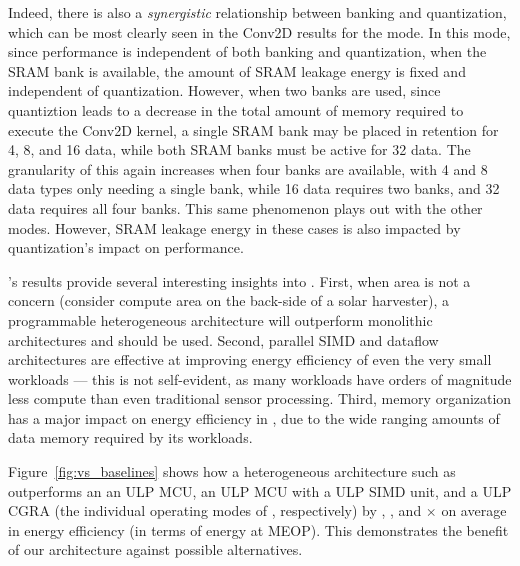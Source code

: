 Indeed, there is also a \textit{synergistic} relationship between
banking and quantization, which can be most clearly seen in the Conv2D results
for the \mcu{} mode. In this mode, since performance is independent of both
banking and quantization, when the SRAM bank is available, the amount of
SRAM leakage energy is fixed and independent of quantization.
However, when two banks are used, since quantiztion leads to a decrease
in the total amount of memory required to execute the Conv2D kernel, a single 
SRAM bank may be placed in retention for 4, 8, and \SI{16}{\bit} data, while
both SRAM banks must be active for \SI{32}{\bit} data.  The granularity
of this again increases when four banks are available, with 4 and \SI{8}{\bit}
data types only needing a single bank, while \SI{16}{\bit} data requires
two banks, and \SI{32}{\bit} data requires all four banks.
This same phenomenon plays out with the other modes. However, SRAM leakage
energy in these cases is also impacted by quantization's impact on performance.

\arch{}'s results provide several interesting insights into \olfc{}.
First, when area is not a concern (consider compute area on the back-side of
a solar harvester), a programmable heterogeneous architecture will outperform
monolithic architectures and should be used.  Second, parallel SIMD and dataflow
architectures are effective at improving energy efficiency of even the
very small \olfc{} workloads --- this is not self-evident, as many \olfc{} workloads
have orders of magnitude less compute than even traditional sensor processing.
Third, memory organization has a major impact on energy efficiency in \olfc{},
due to the wide ranging amounts of data memory required by its workloads.


Figure~\ref{fig:vs_baselines} shows how a heterogeneous architecture such as
\arch{} outperforms an an ULP MCU, an ULP MCU with a ULP SIMD unit, and a ULP
CGRA (the individual operating modes of \arch{}, respectively) by
\BaselineGeomeanMcu{}, \BaselineGeomeanVmacc{}, and
\BaselineGeomeanCgra{}$\times$ on average in energy efficiency (in terms of
energy at MEOP). This demonstrates the benefit of our architecture against
possible alternatives.

